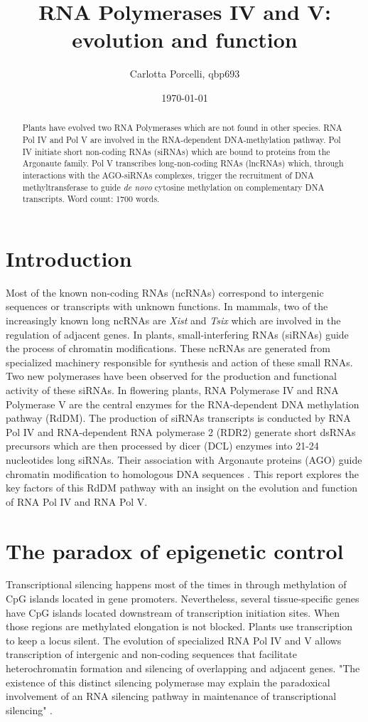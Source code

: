 \documentclass[a4paper, twocolumn]{article}
\title{RNA Polymerases IV and V: evolution and function}
\author{Carlotta Porcelli, qbp693}
\date{\today}
\begin{document}
\maketitle

\begin{abstract}
Plants have evolved two RNA Polymerases which are not found in other species. RNA Pol IV and Pol V are involved in the RNA-dependent DNA-methylation pathway. 
Pol IV initiate short non-coding RNAs (siRNAs) which are bound to proteins from the Argonaute family. Pol V transcribes long-non-coding RNAs (lncRNAs) which, through  interactions with the AGO-siRNAs complexes, trigger the recruitment of DNA methyltransferase to guide \textit{de novo} cytosine methylation on complementary DNA transcripts. 
Word count: 1700 words.
\end{abstract}

\section{Introduction}
Most of the known non-coding RNAs (ncRNAs) correspond to intergenic sequences or transcripts with unknown functions. In mammals, two of the increasingly known long ncRNAs are \textit{Xist} and \textit{Tsix} which are involved in the regulation of adjacent genes. 
In plants, small-interfering RNAs (siRNAs) guide the process of chromatin modifications. These ncRNAs are generated from specialized machinery responsible for synthesis and action of these small RNAs. Two new polymerases have been observed for the production and functional activity of these siRNAs. In flowering plants, RNA Polymerase IV and RNA Polymerase V are the central enzymes for the RNA-dependent DNA methylation pathway (RdDM). The production of siRNAs transcripts is conducted by RNA Pol IV and RNA-dependent RNA polymerase 2 (RDR2) generate short dsRNAs precursors which are then processed by dicer (DCL) enzymes into 21-24 nucleotides long siRNAs. Their association with Argonaute proteins (AGO) guide chromatin modification to homologous DNA sequences \cite{Wierzbicki2009}.
This report explores the key factors of this RdDM pathway with an insight on the evolution and function of RNA Pol IV and RNA Pol V.

\section{The paradox of epigenetic control}
Transcriptional silencing happens most of the times in through methylation of CpG islands located in gene promoters. Nevertheless, several tissue-specific genes have CpG islands located downstream of transcription initiation sites. When those regions are methylated elongation is not blocked. 
Plants use transcription to keep a locus silent. The evolution of specialized RNA Pol IV and V allows transcription of intergenic and non-coding sequences that facilitate heterochromatin formation and silencing of overlapping and adjacent genes. 
"The existence of this distinct silencing polymerase may explain the paradoxical involvement of an RNA silencing pathway in maintenance of transcriptional silencing" \cite{Herr118}.  
\end{document}
